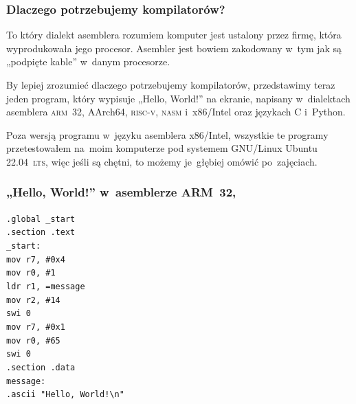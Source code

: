 \documentclass[10pt,t]{beamer}
\begin{document}
\begin{frame}
  \frametitle{Dlaczego potrzebujemy kompilatorów?}


  To który dialekt asemblera rozumiem komputer jest ustalony przez firmę,
  która wyprodukowała jego procesor. Asembler jest bowiem zakodowany w~tym
  jak są „podpięte kable” w~danym procesorze.

  By lepiej zrozumieć dlaczego potrzebujemy kompilatorów, przedstawimy
  teraz jeden program, który wypisuje „Hello, World!” na ekranie, napisany
  w~dialektach asemblera \textsc{arm~32}, AArch64, \textsc{risc-v},
  \textsc{nasm} i~x86/Intel oraz językach C i~Python.

  Poza wersją programu w~języku asemblera x86/Intel, wszystkie te programy
  przetestowałem na~moim komputerze pod systemem GNU/Linux Ubuntu
  22.04~\textsc{lts}, więc jeśli są chętni, to możemy je~głębiej omówić
  po~zajęciach.

\end{frame}





\begin{frame}
  \frametitle{„Hello, World!” w~asemblerze ARM~32,
    \parencite{Low-Level-Learning-You-Can-Learn-ARM-ETC-Ver-2020}}


  \texttt{.global \_start} \\
  \texttt{.section .text} \\



  \texttt{\_start:} \\[-0.2em]
  \hphantom{aaaaaaaa} \texttt{mov r7, \#0x4} \\
  \hphantom{aaaaaaaa} \texttt{mov r0, \#1} \\
  \hphantom{aaaaaaaa} \texttt{ldr r1, =message} \\
  \hphantom{aaaaaaaa} \texttt{mov r2, \#14} \\

  \hphantom{aaaaaaaa} \texttt{swi 0} \\

  \hphantom{aaaaaaaa} \texttt{mov r7, \#0x1} \\
  \hphantom{aaaaaaaa} \texttt{mov r0, \#65} \\

  \hphantom{aaaaaaaa} \texttt{swi 0} \\



  \texttt{.section .data} \\
  \texttt{message:} \\
  \hphantom{aaaaaaaa} \texttt{.ascii "Hello, World!\textbackslash n"}

\end{frame}
\end{document}
